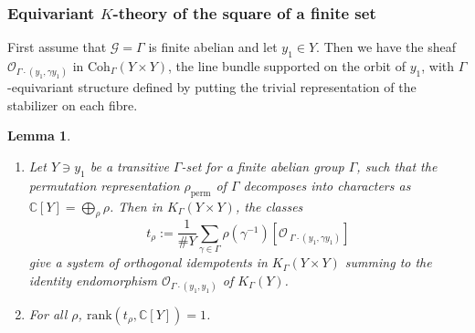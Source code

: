 \documentclass[10pt]{article}
\newcommand{\Coh}{\mathrm{Coh}}
\newcommand{\C}{\mathbb{C}}
\newcommand{\Oo}{\mathcal{O}}
\newtheorem{lem}{Lemma}
\theoremstyle{definition}
\theoremstyle{remark}
\newcommand{\rank}{\mathrm{rank}}
\newcommand{\Zz}{\mathcal{G}}
\begin{document}
\subsubsection{Equivariant $K$-theory of the square of a finite set}
\label{subsubsection Equivariant K-theory of square of a finite set}
First assume that $\Zz=\Gamma$ is finite abelian and let $y_1\in Y$. 
Then we have the sheaf $\Oo_{\Gamma\cdot (y_1,\gamma y_1)}$ in
$\Coh_\Gamma(Y\times Y)$, the line bundle
supported on the orbit of $y_1$, with $\Gamma$-equivariant structure defined by putting the trivial 
representation of the stabilizer on each fibre.
%
\begin{lem}
\label{lem orthogonal idempotents for unextended set}
\begin{enumerate}
\item[(a)] 
Let $Y\owns y_1$ be a transitive $\Gamma$-set for a finite abelian group $\Gamma$, such that the permutation representation $\rho_{\mathrm{perm}}$ of $\Gamma$ decomposes into 
characters as $\C[Y]=\bigoplus_\rho\rho$. Then in $K_\Gamma(Y\times Y)$, the classes
%
\[
t_\rho:=\frac{1}{\# Y}\sum_{\gamma\in\Gamma}\rho(\gamma^{-1})[\Oo_{\
\Gamma\cdot (y_1,\gamma y_1)}]
\]
%
give a system of orthogonal idempotents in $K_\Gamma(Y\times Y)$
summing to the identity endomorphism $\Oo_{\Gamma\cdot(y_1,y_1)}$ of $K_\Gamma(Y)$.
%
\item[(b)]
For all $\rho$, $\rank(t_\rho, \C[Y])=1$.
\end{enumerate}
\end{lem}
%
\end{document}
